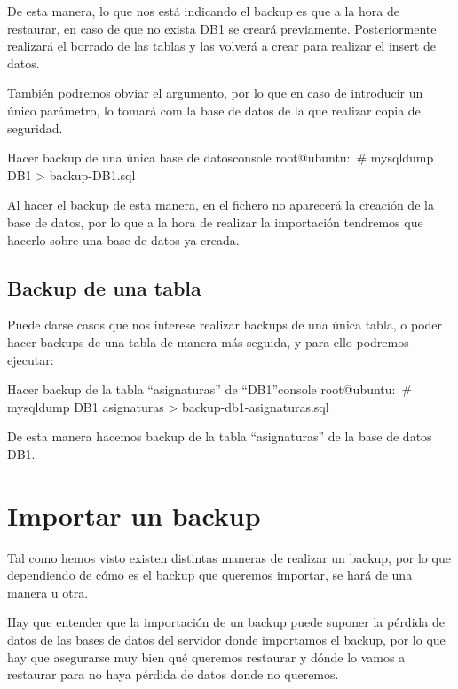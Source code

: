De esta manera, lo que nos está indicando el backup es que a la hora de restaurar, en caso de que no exista DB1 se creará previamente. Posteriormente realizará el borrado de las tablas y las volverá a crear para realizar el insert de datos.

También podremos obviar el argumento, por lo que en caso de introducir un único parámetro, lo tomará com la base de datos de la que realizar copia de seguridad.

\begin{mycode}{Hacer backup de una única base de datos}{console}{}
root@ubuntu:~# mysqldump DB1 > backup-DB1.sql
\end{mycode}

Al hacer el backup de esta manera, en el fichero no aparecerá la creación de la base de datos, por lo que a la hora de realizar la importación tendremos que hacerlo sobre una base de datos ya creada.

\subsection{Backup de una tabla}
Puede darse casos que nos interese realizar backups de una única tabla, o poder hacer backups de una tabla de manera más seguida, y para ello podremos ejecutar:

\begin{mycode}{Hacer backup de la tabla “asignaturas” de “DB1”}{console}{}
root@ubuntu:~# mysqldump DB1 asignaturas > backup-db1-asignaturas.sql
\end{mycode}

De esta manera hacemos backup de la tabla “asignaturas” de la base de datos DB1.


\section{Importar un backup}
Tal como hemos visto existen distintas maneras de realizar un backup, por lo que dependiendo de cómo es el backup que queremos importar, se hará de una manera u otra.

Hay que entender que la importación de un backup puede suponer la pérdida de datos de las bases de datos del servidor donde importamos el backup, por lo que hay que asegurarse muy bien qué queremos restaurar y dónde lo vamos a restaurar para no haya pérdida de datos donde no queremos.


